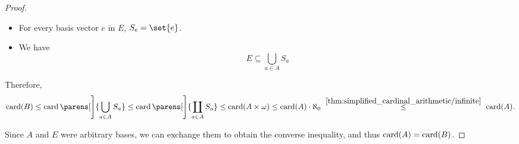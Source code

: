 \begin{proof}
\begin{itemize}
    \item For every basis vector \( e \) in \( E \), \( S_e = \set{ e } \).

    \item We have
    \begin{equation*}
      E \subseteq \bigcup_{a \in A} S_a
    \end{equation*}
  \end{itemize}

  Therefore,
  \begin{equation*}
    \card(B)
    \leq
    \card\parens[\Bigg]{ \bigcup_{a \in A} S_a }
    \leq
    \card\parens[\Bigg]{ \coprod_{a \in A} S_a }
    \leq
    \card(A \times \omega)
    \leq
    \card(A) \cdot \aleph_0
    \reloset {\ref{thm:simplified_cardinal_arithmetic/infinite}} \leq
    \card(A).
  \end{equation*}

  Since \( A \) and \( E \) were arbitrary bases, we can exchange them to obtain the converse inequality, and thus \( \operatorname{card}(A) = \operatorname{card}(B) \).
\end{proof}

